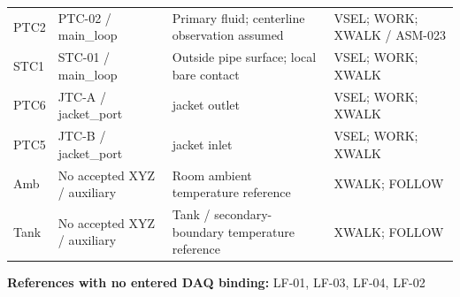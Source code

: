 \documentclass[11pt]{article}
\begin{document}
\begin{longtable}{>{\raggedright\arraybackslash}p{}>{\raggedright\arraybackslash}p{}>{\raggedright\arraybackslash}p{}>{\raggedright\arraybackslash}p{}}
PTC2 & PTC-02 / main\_\allowbreak{}loop & Primary fluid; centerline observation assumed & VSEL; WORK; XWALK / ASM-023\\[4pt]
STC1 & STC-01 / main\_\allowbreak{}loop & Outside pipe surface; local bare contact & VSEL; WORK; XWALK\\[4pt]
PTC6 & JTC-A / jacket\_\allowbreak{}port & jacket outlet & VSEL; WORK; XWALK\\[4pt]
PTC5 & JTC-B / jacket\_\allowbreak{}port & jacket inlet & VSEL; WORK; XWALK\\[4pt]
Amb & No accepted XYZ / auxiliary & Room ambient temperature reference & XWALK; FOLLOW\\[4pt]
Tank & No accepted XYZ / auxiliary & Tank / secondary-boundary temperature reference & XWALK; FOLLOW\\[4pt]
\bottomrule\end{longtable}\endgroup
\textbf{References with no entered DAQ binding:} LF-01, LF-03, LF-04, LF-02\par
\end{document}
